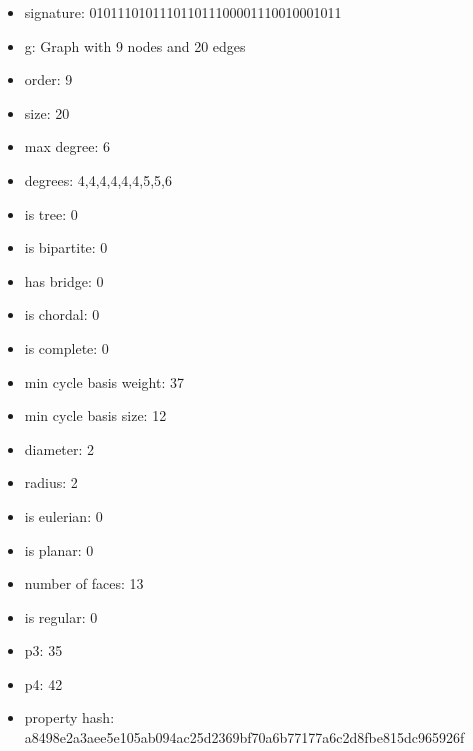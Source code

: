 \newpage
\begin{figure}
\end{figure}
\begin{itemize}
\item signature: 010111010111011011100001110010001011
\item g: Graph with 9 nodes and 20 edges
\item order: 9
\item size: 20
\item max degree: 6
\item degrees: 4,4,4,4,4,4,5,5,6
\item is tree: 0
\item is bipartite: 0
\item has bridge: 0
\item is chordal: 0
\item is complete: 0
\item min cycle basis weight: 37
\item min cycle basis size: 12
\item diameter: 2
\item radius: 2
\item is eulerian: 0
\item is planar: 0
\item number of faces: 13
\item is regular: 0
\item p3: 35
\item p4: 42
\item property hash: a8498e2a3aee5e105ab094ac25d2369bf70a6b77177a6c2d8fbe815dc965926f
\end{itemize}
